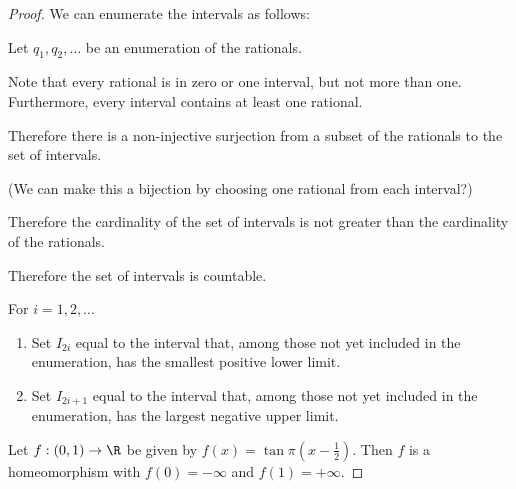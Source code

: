 \begin{enumerate}
\begin{proof}




    We can enumerate the intervals as follows:

    Let $q_1, q_2, \ldots$ be an enumeration of the rationals.

    Note that every rational is in zero or one interval, but not more than one. Furthermore, every interval
    contains at least one rational.

    Therefore there is a non-injective surjection from a subset of the rationals to the set of intervals.

    (We can make this a bijection by choosing one rational from each interval?)

    Therefore the cardinality of the set of intervals is not greater than the cardinality of the rationals.

    Therefore the set of intervals is countable.



    For $i = 1, 2, \ldots$
    \begin{enumerate}
    \item Set $I_{2i}$ equal to the interval that, among those not yet included in the enumeration, has the
      smallest positive lower limit.
    \item Set $I_{2i + 1}$ equal to the interval that, among those not yet included in the enumeration, has the
      largest negative upper limit.
    \end{enumerate}


    Let $f: (0, 1) \to \R$ be given by $f(x) = \tan \pi(x -\frac{1}{2})$. Then $f$ is a homeomorphism with $f(0) = -\infty$ and $f(1) = +\infty$.
  \end{proof}


\end{enumerate}
